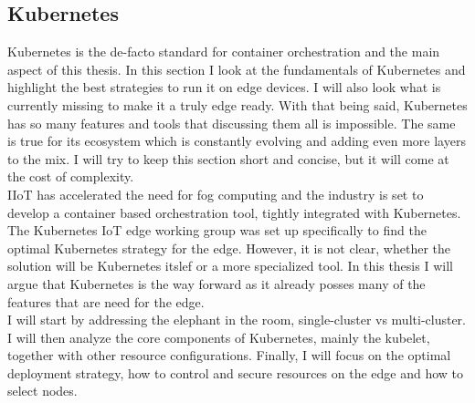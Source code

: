 \subsection{Kubernetes} \label{kubernetes}
Kubernetes is the de-facto standard for container orchestration and the main aspect of this thesis. In this section I look at the fundamentals of Kubernetes and highlight the best strategies to run it on edge devices. I will also look what is currently missing to make it a truly edge ready. With that being said, Kubernetes has so many features and tools that discussing them all is impossible. The same is true for its ecosystem which is constantly evolving and adding even more layers to the mix. I will try to keep this section short and concise, but it will come at the cost of complexity.\\
IIoT has accelerated the need for fog computing and the industry is set to develop a container based orchestration tool, tightly integrated with Kubernetes. The Kubernetes IoT edge working group was set up specifically to find the optimal Kubernetes strategy for the edge. However, it is not clear, whether the solution will be Kubernetes itslef or a more specialized tool. In this thesis I will argue that Kubernetes is the way forward as it already posses many of the features that are need for the edge.\\ 
I will start by addressing the elephant in the room, single-cluster vs multi-cluster. I will then analyze the core components of Kubernetes, mainly the kubelet, together with other resource configurations. Finally, I will focus on the optimal deployment strategy, how to control and secure resources on the edge and how to select nodes.





